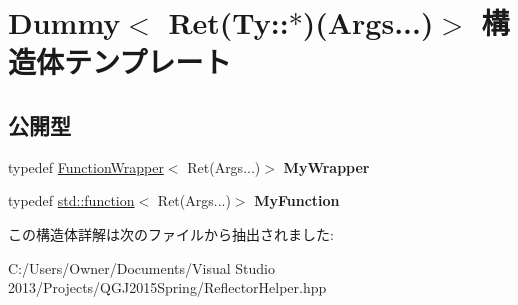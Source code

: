 \hypertarget{struct_dummy_3_01_ret_07_ty_1_1_5_08_07_args_8_8_8_08_4}{}\section{Dummy$<$ Ret(Ty\+:\+:$\ast$)(Args...)$>$ 構造体テンプレート}
\label{struct_dummy_3_01_ret_07_ty_1_1_5_08_07_args_8_8_8_08_4}
\subsection*{公開型}
\begin{DoxyCompactItemize}
\item 
typedef \hyperlink{class_function_wrapper}{Function\+Wrapper}$<$ Ret(Args...)$>$ {\bfseries My\+Wrapper}\hypertarget{struct_dummy_3_01_ret_07_ty_1_1_5_08_07_args_8_8_8_08_4_a740b59d50e28fc3e277226241b216993}{}\label{struct_dummy_3_01_ret_07_ty_1_1_5_08_07_args_8_8_8_08_4_a740b59d50e28fc3e277226241b216993}

\item 
typedef \hyperlink{classstd_1_1function}{std\+::function}$<$ Ret(Args...)$>$ {\bfseries My\+Function}\hypertarget{struct_dummy_3_01_ret_07_ty_1_1_5_08_07_args_8_8_8_08_4_a0b824bb28b372056bf1425c60b4f12f2}{}\label{struct_dummy_3_01_ret_07_ty_1_1_5_08_07_args_8_8_8_08_4_a0b824bb28b372056bf1425c60b4f12f2}

\end{DoxyCompactItemize}


この構造体詳解は次のファイルから抽出されました\+:\begin{DoxyCompactItemize}
\item 
C\+:/\+Users/\+Owner/\+Documents/\+Visual Studio 2013/\+Projects/\+Q\+G\+J2015\+Spring/Reflector\+Helper.\+hpp\end{DoxyCompactItemize}
